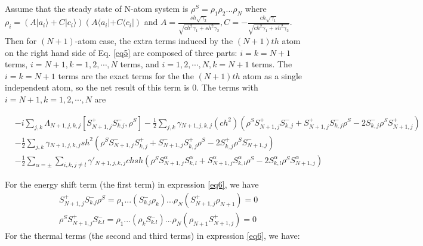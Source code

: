 \documentclass[aps,showpacs,twocolumn,twoside,groupedaddress]{revtex4}
\begin{document}
Assume that the steady state of N-atom system is $\rho^{S}=\rho_{1}\rho_{2}...\rho_{N}$ where $\rho_{i}=(A|a_{i}\rangle+C|c_{i}\rangle)(A\langle a_{i}|+C\langle c_{i}|)$ and $A=\frac{sh\sqrt{\gamma_{2}}}{\sqrt{ch^{2}\gamma_{1}+sh^{2}\gamma_{2}}}, C=-\frac{ch\sqrt{\gamma_{1}}}{\sqrt{ch^{2}\gamma_{1}+sh^{2}\gamma_{2}}}$. Then for $(N+1)$-atom case, the extra terms induced by the $(N+1)th$ atom on the right hand side of Eq. \eqref{eq5} are composed of three parts: $i=k=N+1$ terms, $i=N+1, k=1,2,\cdots,N$ terms, and $i=1,2,\cdots,N, k=N+1$ terms. The $i=k=N+1$ terms are the exact terms for the the $(N+1)th$ atom as a single independent atom, so the net result of this term is 0. The terms with $i=N+1, k=1,2,\cdots, N$ are 
\begin{widetext}
\begin{equation}
\label{eq6}
\begin{split}
&-i\underset{j,k}{\sum}\Lambda_{N+1,j,k,j}[S_{N+1,j}^{+}S_{k.j}^{-},\rho^{S}] 
-\frac{1}{2}\underset{j,k}{\sum}\gamma{}_{N+1,j,k,j}(ch^{2})(\rho^{S}S_{N+1,j}^{+}S_{k,j}^{-}+S_{N+1,j}^{+}S_{k,j}^{-}\rho^{S}-2S_{k,j}^{-}\rho^{S}S_{N+1,j}^{+})\\
&-\frac{1}{2}\underset{j,k}{\sum}\gamma{}_{N+1,j,k,j}sh^{2}(\rho^{S}S_{N+1,j}^{-}S_{k,j}^{+}+S_{N+1,j}^{-}S_{k,j}^{+}\rho^{S}-2S_{k,j}^{+}\rho^{S}S_{N+1,j}^{-}) \\
&-\frac{1}{2}\sum_{\alpha=\pm}\underset{i,k,j\ne l}{\sum}\gamma'_{N+1,j,k,j}chsh(\rho^{S}S_{N+1,j}^{\alpha}S_{k,l}^{\alpha}+S_{N+1,j}^{\alpha}S_{k,l}^{\alpha}\rho^{S}-2S_{k,l}^{\alpha}\rho^{S}S_{N+1,j}^{\alpha})
\end{split}
\end{equation}
\end{widetext}
For the energy shift term (the first term) in expression \eqref{eq6}, we have 
\begin{equation}
\label{eq7}
\begin{split}
&S_{N+1,j}^{+}S_{k.j}^{-}\rho^{S}=\rho_{1}...(S_{k.j}^{-}\rho_{k})...\rho_{N}(S_{N+1,j}^{+}\rho_{N+1})=0\\
&\rho^{S}S_{N+1,j}^{+}S_{k.l}^{-}=\rho_{1}...(\rho_{k}S_{k.l}^{-})...\rho_{N}(\rho_{N+1}S_{N+1,j}^{+})=0
\end{split}
\end{equation}
For the thermal terms (the second and third terms) in expression \eqref{eq6}, we have:
\end{document}
